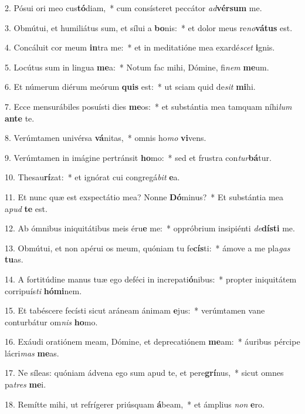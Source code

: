 2. Pósui ori meo cus\textbf{tó}diam,~*  cum consísteret peccátor \textit{ad}\textbf{vér}\textbf{sum} me.\

3. Obmútui, et humiliátus sum, et sílui a \textbf{bo}nis:~*  et dolor meus re\textit{no}\textbf{vá}\textbf{tus} est.\

4. Concáluit cor meum \textbf{in}tra me:~*  et in meditatióne mea exardé\textit{scet} \textbf{i}gnis.\

5. Locútus sum in lingua \textbf{me}a:~*  Notum fac mihi, Dómine, fi\textit{nem} \textbf{me}um.\

6. Et númerum diérum meórum \textbf{quis} est:~*  ut sciam quid de\textit{sit} \textbf{mi}hi.\

7. Ecce mensurábiles posuísti dies \textbf{me}os:~*  et substántia mea tamquam níhi\textit{lum} \textbf{an}\textbf{te} te.\

8. Verúmtamen univérsa \textbf{vá}nitas,~*  omnis ho\textit{mo} \textbf{vi}vens.\

9. Verúmtamen in imágine pertránsit \textbf{ho}mo:~*  sed et frustra con\textit{tur}\textbf{bá}tur.\

10. Thesau\textbf{rí}zat:~*  et ignórat cui congregá\textit{bit} \textbf{e}a.\

11. Et nunc quæ est exspectátio mea? Nonne \textbf{Dó}minus?~*  Et substántia mea a\textit{pud} \textbf{te} est.\

12. Ab ómnibus iniquitátibus meis éru\textbf{e} me:~*  oppróbrium insipiénti \textit{de}\textbf{dís}\textbf{ti} me.\

13. Obmútui, et non apérui os meum, quóniam tu fe\textbf{cís}ti:~*  ámove a me pla\textit{gas} \textbf{tu}as.\

14. A fortitúdine manus tuæ ego deféci in increpati\textbf{ó}nibus:~*  propter iniquitátem corripuís\textit{ti} \textbf{hó}\textbf{mi}nem.\

15. Et tabéscere fecísti sicut aráneam ánimam \textbf{e}jus:~*  verúmtamen vane conturbátur om\textit{nis} \textbf{ho}mo.\

16. Exáudi oratiónem meam, Dómine, et deprecatiónem \textbf{me}am:~*  áuribus pércipe lácri\textit{mas} \textbf{me}as.\

17. Ne síleas: quóniam ádvena ego sum apud te, et pere\textbf{grí}nus,~*  sicut omnes pa\textit{tres} \textbf{me}i.\

18. Remítte mihi, ut refrígerer priúsquam \textbf{á}beam,~*  et ámplius \textit{non} \textbf{e}ro.\

